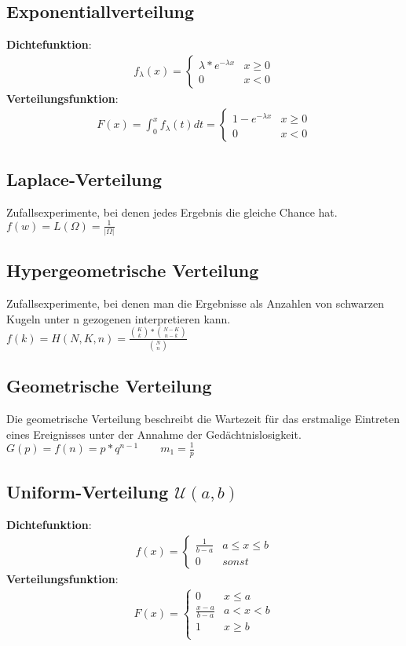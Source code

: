 \documentclass{article}
\begin{document}
	\subsection{Exponentiallverteilung}
	\textbf{Dichtefunktion}:
	\begin{align} f_\lambda(x) =
	\begin{cases}
	\lambda*e^{-\lambda x} & x \geq 0 \\
	0                                     & x <    0
	\end{cases}
	\end{align}
	\textbf{Verteilungsfunktion}:
	\begin{align} F(x) = \int_0^x f_\lambda(t) dt =
	\begin{cases}
	1 - e^{-\lambda x} & x \geq 0 \\
	0                                     & x <    0
	\end{cases}
	\end{align}
	\subsection{Laplace-Verteilung}
	Zufallsexperimente, bei denen jedes Ergebnis die gleiche Chance hat. \\
	$f(w) = L(\Omega) = \frac{1}{|\Omega|}$
	\subsection{Hypergeometrische Verteilung}
	Zufallsexperimente, bei denen man die Ergebnisse als Anzahlen von schwarzen Kugeln unter 	n gezogenen interpretieren kann. \\
	$f(k) = H(N, K, n) = \frac{\binom{K}{k}*\binom{N-K}{n-k}}{\binom{N}{n}}$
	\subsection{Geometrische Verteilung}
	Die geometrische Verteilung beschreibt die Wartezeit für das erstmalige Eintreten eines 	
	Ereignisses unter der Annahme der Gedächtnislosigkeit. \\
	$G(p) = f(n) = p*q^{n-1} \quad \quad m_1 = \frac{1}{p}$
	\subsection{Uniform-Verteilung $\mathcal{U}(a,b)$}
	\textbf{Dichtefunktion}:
	\begin{align} f(x) =
	\begin{cases}
	\frac{1}{b - a} & a \leq x \leq b \\
	0               &  sonst
	\end{cases}
	\end{align}
	\textbf{Verteilungsfunktion}:
	\begin{align} F(x) =
	\begin{cases}
	0     & x \leq a\\
	\frac{x - a}{b - a} & a < x < b \\
	1     & x \geq b\\
	\end{cases}
	\end{align}
	
\end{document}
